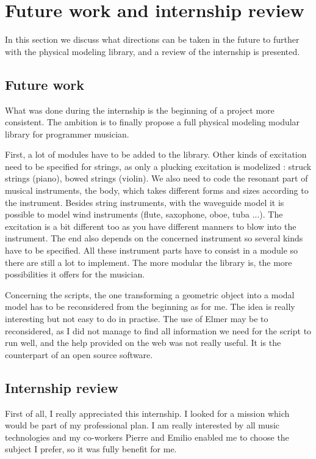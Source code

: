 \chapter{Future work and internship review}

In this section we discuss what directions can be taken in the future to further with the physical modeling library, and a review of the internship is presented.

\section{Future work}

What was done during the internship is the beginning of a project more consistent. The ambition is to finally propose a full physical modeling modular library for programmer musician.

First, a lot of modules have to be added to the library. Other kinds of excitation need to be specified for strings, as only a plucking excitation is modelized : struck strings (piano), bowed strings (violin). We also need to code the resonant part of musical instruments, the body, which takes different forms and sizes according to the instrument.
Besides string instruments, with the waveguide model it is possible to model wind instruments (flute, saxophone, oboe, tuba ...). The excitation is a bit different too as you have different manners to blow into the instrument. The end also depends on the concerned instrument so several kinds have to be specified.
All these instrument parts have to consist in a module so there are still a lot to implement. The more modular the library is, the more possibilities it offers for the musician.

Concerning the scripts, the one transforming a geometric object into a modal model has to be reconsidered from the beginning as for me. The idea is really interesting but not easy to do in practise. The use of Elmer may be to reconsidered, as I did not manage to find all information we need for the script to run well, and the help provided on the web was not really useful. It is the counterpart of an open source software. 

\section{Internship review}

First of all, I really appreciated this internship. I looked for a mission which would be part of my professional plan. I am really interested by all music technologies and my co-workers Pierre and Emilio enabled me to choose the subject I prefer, so it was fully benefit for me.

